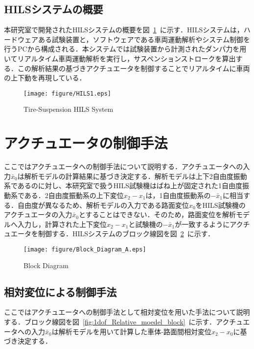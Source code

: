 \documentclass[a4paper,12pt]{article_vdlab_sotsuron}
\begin{document}
\newpage
\subsection{HILSシステムの概要}
本研究室で開発されたHILSシステムの概要を図~\ref{fig:HILS}~に示す．HILSシステムは，ハードウェアある試験装置と，ソフトウェアである車両運動解析やシステム制御を行うPCから構成される．本システムでは試験装置から計測されたダンパ力を用いてリアルタイム車両運動解析を実行し，サスペンションストロークを算出する．この解析結果の基づきアクチュエータを制御することでリアルタイムに車両の上下動を再現している．
\vspace*{10mm}
\begin{figure}[htp]
  \begin{center}
    \texttt{[image: figure/HILS1.eps]}
    \vspace*{3mm}
    \caption{Tire-Suspension HILS System}
    \label{fig:HILS}
  \end{center}
\end{figure}
\vspace*{10mm}
\newpage
\section{アクチュエータの制御手法}
ここではアクチュエータへの制御手法について説明する．アクチュエータへの入力$\bar{x}_0$は解析モデルの計算結果に基づき決定する．解析モデルは上下2自由度振動系であるのに対し、本研究室で扱うHILS試験機はばね上が固定された1自由度振動系である．2自由度振動系の上下変位$x_2-x_1$は，1自由度振動系の$-\bar{x}_1$に相当する．自由度が異なるため、解析モデルの入力である路面変位$x_0$をHILS試験機のアクチュエータの入力$\bar{x}_0$とすることはできない．そのため，路面変位を解析モデルへ入力し，計算された上下変位$x_2-x_1$と試験機の$-\bar{x}_1$が一致するようにアクチュエータを制御する．HILSシステムのブロック線図を図~\ref{fig:1dof_block}~に示す．

\begin{figure}[htp]
  \begin{center}
    \texttt{[image: figure/Block\_Diagram\_A.eps]}
    \vspace*{3mm}
    \caption{Block Diagram}
    \label{fig:1dof_block}
  \end{center}
\end{figure}
\subsection{相対変位による制御手法}
ここではアクチュエータへの制御手法として相対変位を用いた手法について説明する．ブロック線図を図~\ref{fig:1dof_Relative_moedel_block}~に示す．アクチュエータへの入力$\bar x_0$は解析モデルを用いて計算した車体-路面間相対変位$x_2-x_0$に基づき決定する．
\end{document}
